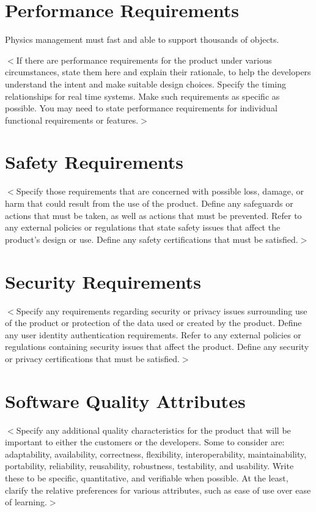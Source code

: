 \documentclass{scrreprt}
\begin{document}
\section{Performance Requirements}

Physics management must fast and able to support thousands of objects.


$<$If there are performance requirements for the product under various 
circumstances, state them here and explain their rationale, to help the 
developers understand the intent and make suitable design choices. Specify the 
timing relationships for real time systems. Make such requirements as specific 
as possible. You may need to state performance requirements for individual 
functional requirements or features.$>$

\section{Safety Requirements}
$<$Specify those requirements that are concerned with possible loss, damage, or 
harm that could result from the use of the product. Define any safeguards or 
actions that must be taken, as well as actions that must be prevented. Refer to 
any external policies or regulations that state safety issues that affect the 
product’s design or use. Define any safety certifications that must be 
satisfied.$>$

\section{Security Requirements}
$<$Specify any requirements regarding security or privacy issues surrounding use 
of the product or protection of the data used or created by the product. Define 
any user identity authentication requirements. Refer to any external policies or 
regulations containing security issues that affect the product. Define any 
security or privacy certifications that must be satisfied.$>$

\section{Software Quality Attributes}
$<$Specify any additional quality characteristics for the product that will be 
important to either the customers or the developers. Some to consider are: 
adaptability, availability, correctness, flexibility, interoperability, 
maintainability, portability, reliability, reusability, robustness, testability, 
and usability. Write these to be specific, quantitative, and verifiable when 
possible. At the least, clarify the relative preferences for various attributes, 
such as ease of use over ease of learning.$>$
\end{document}
